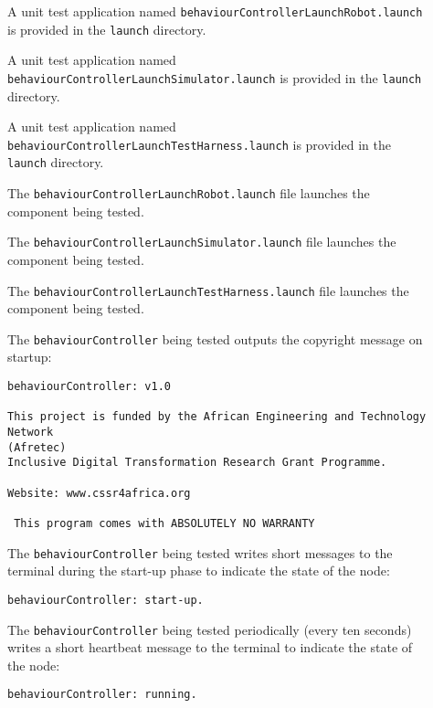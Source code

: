 \documentclass{CSSRforAfrica}
\newcommand{\checkboxChecked}{\fbox{\ding{51}}} %
\newcommand{\checkboxDashed}{\fbox{--}}         %
\begin{document}
\begin{description}
\item[\checkboxDashed] A unit test application named {\small \verb+behaviourControllerLaunchRobot.launch+} is provided in the {\small \verb+launch+} directory. 

\item[\checkboxDashed] A unit test application named {\small \verb+behaviourControllerLaunchSimulator.launch+} is provided in the {\small \verb+launch+} directory. 

\item[\checkboxDashed] A unit test application named {\small \verb+behaviourControllerLaunchTestHarness.launch+} is provided in the {\small \verb+launch+} directory. 

\item[\checkboxDashed] The {\small \verb+behaviourControllerLaunchRobot.launch+} file  launches the component being tested.

\item[\checkboxDashed] The {\small \verb+behaviourControllerLaunchSimulator.launch+} file  launches the component being tested.

\item[\checkboxDashed] The {\small \verb+behaviourControllerLaunchTestHarness.launch+} file  launches the component being tested.

\item[\checkboxChecked]  The {\small \verb+behaviourController+} being tested outputs the copyright message on startup:
\begin{verbatim}
behaviourController: v1.0
 
This project is funded by the African Engineering and Technology Network 
(Afretec) 
Inclusive Digital Transformation Research Grant Programme.
 
Website: www.cssr4africa.org
 
 This program comes with ABSOLUTELY NO WARRANTY
\end{verbatim}

\item[\checkboxChecked]  The {\small \verb+behaviourController+} being tested writes short messages to the terminal during the start-up phase to
 indicate the state of the node:
\begin{verbatim}
behaviourController: start-up.
\end{verbatim}

\item[\checkboxChecked]  The {\small \verb+behaviourController+} being tested periodically (every ten seconds) writes a short heartbeat message to
 the terminal to indicate the state of the node:
\begin{verbatim}
behaviourController: running.
\end{verbatim}


\end{description}
\end{document}
